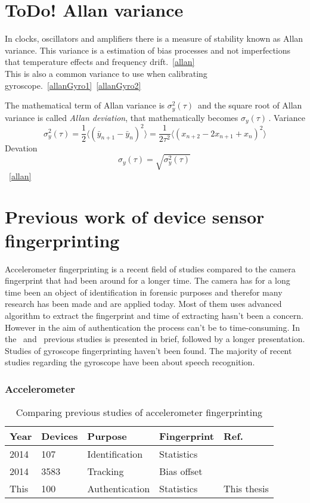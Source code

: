 \section{\textbf{ToDo!} Allan variance}\label{char:allan}
In clocks, oscillators and amplifiers there is a measure of stability known as Allan variance. This variance is a estimation of bias processes and not imperfections that temperature effects and frequency drift.~\ref{allan}\\ 
This is also a common variance to use when calibrating gyroscope.~\ref{allanGyro1}~\ref{allanGyro2}

The mathematical term of Allan variance is $\sigma_y^2(\tau)\, $ and the square root of Allan variance is called \textit{Allan deviation}, that mathematically becomes $\sigma_y(\tau)\,$. 
Variance
$$\sigma_y^2(\tau) = \frac{1}{2}\langle(\bar{y}_{n+1}-\bar{y}_n)^2\rangle = \frac{1}{2\tau^2}\langle(x_{n+2}-2x_{n+1}+x_n)^2\rangle$$
Devation
$$\sigma_y(\tau) = \sqrt{\sigma_y^2(\tau)} \, $$
~\ref{allan}


\section{Previous work of device sensor fingerprinting}
Accelerometer fingerprinting is a recent field of studies compared to the camera fingerprint that had been around for a longer time. The camera has for a long time been an object of identification in forensic purposes and therefor many research has been made and are applied today. Most of them uses advanced algorithm to extract the fingerprint and time of extracting hasn't been a concern. However in the aim of authentication the process can't be to time-consuming. In the~ and~ previous studies is presented in brief, followed by a longer presentation. Studies of gyroscope fingerprinting haven't been found. The majority of recent studies regarding the gyroscope have been about speech recognition. \cite{sensor:speechGyro} 



\begin{table}[H]
\subsubsection*{Accelerometer}
\centering
\begin{tabular}{| p{1cm} | p{1cm} | p{2.5cm} | p{1.8cm} | p{3.5cm} |}
  Year & Devices & Purpose & Fingerprint & Ref. \\ \hline
  2014 & 107 & Identification & Statistics &~\cite{sensor:accelPrint} \\
  2014 & 3583 & Tracking & Bias offset &~\cite{sensor:micSpeak} \\
  This & 100 & Authentication & Statistics & This thesis \\ \hline
\end{tabular} 
\caption[Table caption text]{Comparing previous studies of accelerometer fingerprinting} \label{table:prevAcc}
\end{table}


